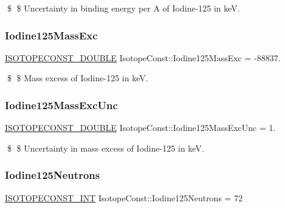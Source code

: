 \$ \$ Uncertainty in binding energy per A of Iodine-\/125 in keV. \mbox{\label{group___isotope_const-_iodine-_i125_gae38e16bbc5dc2eaed785f562cabeb0bb}} 
\subsubsection{\texorpdfstring{Iodine125\+Mass\+Exc}{Iodine125MassExc}}
{\footnotesize\ttfamily \mbox{\hyperlink{group___isotope_const-_macros_ga8f45a7272ce02c0b4c65c44636ed719a}{I\+S\+O\+T\+O\+P\+E\+C\+O\+N\+S\+T\+\_\+\+D\+O\+U\+B\+LE}} Isotope\+Const\+::\+Iodine125\+Mass\+Exc = -\/88837.}

\$ \$ Mass excess of Iodine-\/125 in keV. \mbox{\label{group___isotope_const-_iodine-_i125_ga39cab9ef613f90d085ddea987694f331}} 
\subsubsection{\texorpdfstring{Iodine125\+Mass\+Exc\+Unc}{Iodine125MassExcUnc}}
{\footnotesize\ttfamily \mbox{\hyperlink{group___isotope_const-_macros_ga8f45a7272ce02c0b4c65c44636ed719a}{I\+S\+O\+T\+O\+P\+E\+C\+O\+N\+S\+T\+\_\+\+D\+O\+U\+B\+LE}} Isotope\+Const\+::\+Iodine125\+Mass\+Exc\+Unc = 1.}

\$ \$ Uncertainty in mass excess of Iodine-\/125 in keV. \mbox{\label{group___isotope_const-_iodine-_i125_gaa21981d81f7d9daaf3c9457f76a690b9}} 
\subsubsection{\texorpdfstring{Iodine125\+Neutrons}{Iodine125Neutrons}}
{\footnotesize\ttfamily \mbox{\hyperlink{group___isotope_const-_macros_ga5f18360b3e99483a35c32d789e62621c}{I\+S\+O\+T\+O\+P\+E\+C\+O\+N\+S\+T\+\_\+\+I\+NT}} Isotope\+Const\+::\+Iodine125\+Neutrons = 72}

